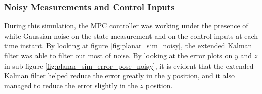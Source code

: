 \documentclass{thesisreport}
\begin{document}
\subsubsection*{Noisy Measurements and Control Inputs}

During this simulation, the MPC controller was working under the presence of white Gaussian noise on the state measurement and on the control inputs at each time instant. By looking at figure \ref{fig:planar_sim_noisy}, the extended Kalman filter was able to filter out most of noise. By looking at the error plots on $y$ and $z$ in sub-figure \ref{fig:planar_sim_error_pose_noisy}, it is evident that the extended Kalman filter helped reduce the error greatly in the $y$ position, and it also managed to reduce the error slightly in the $z$ position.

\newpage
\end{document}
